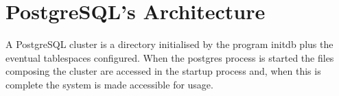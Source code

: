 \chapter{PostgreSQL's Architecture}
A PostgreSQL cluster is a directory initialised by the program initdb plus the eventual tablespaces configured. 
When the  postgres process is started the files composing the cluster are accessed in the startup process and, when this is complete
the system is made accessible for usage.



